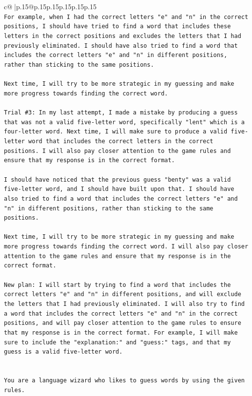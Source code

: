 \documentclass{article}
\begin{document}
{\begin{supertabular}{c@{$\;$}|p{.15\linewidth}@{}p{.15\linewidth}p{.15\linewidth}p{.15\linewidth}p{.15\linewidth}p{.15\linewidth}}
{{{\\ 
\texttt{For example, when I had the correct letters "e" and "n" in the correct positions, I should have tried to find a word that includes these letters in the correct positions and excludes the letters that I had previously eliminated. I should have also tried to find a word that includes the correct letters "e" and "n" in different positions, rather than sticking to the same positions. } \\
\\ 
\texttt{Next time, I will try to be more strategic in my guessing and make more progress towards finding the correct word.} \\
\\ 
\texttt{Trial \#3: In my last attempt, I made a mistake by producing a guess that was not a valid five{-}letter word, specifically "lent" which is a four{-}letter word. Next time, I will make sure to produce a valid five{-}letter word that includes the correct letters in the correct positions. I will also pay closer attention to the game rules and ensure that my response is in the correct format. } \\
\\ 
\texttt{I should have noticed that the previous guess "benty" was a valid five{-}letter word, and I should have built upon that. I should have also tried to find a word that includes the correct letters "e" and "n" in different positions, rather than sticking to the same positions. } \\
\\ 
\texttt{Next time, I will try to be more strategic in my guessing and make more progress towards finding the correct word. I will also pay closer attention to the game rules and ensure that my response is in the correct format. } \\
\\ 
\texttt{New plan: I will start by trying to find a word that includes the correct letters "e" and "n" in different positions, and will exclude the letters that I had previously eliminated. I will also try to find a word that includes the correct letters "e" and "n" in the correct positions, and will pay closer attention to the game rules to ensure that my response is in the correct format. For example, I will make sure to include the "explanation:" and "guess:" tags, and that my guess is a valid five{-}letter word.} \\
\\ 
\\ 
\texttt{You are a language wizard who likes to guess words by using the given rules.} \\
}}}
\end{supertabular}}
\end{document}
